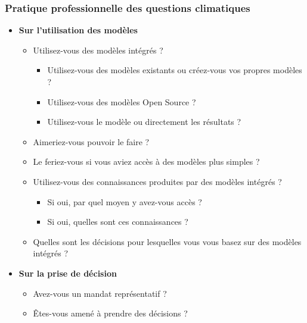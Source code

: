 \subsubsection*{Pratique professionnelle des questions climatiques}
\begin{itemize}
    \item \textbf{Sur l'utilisation des modèles}
    \begin{itemize}
        \item Utilisez-vous des modèles intégrés ? 
        \begin{itemize}
            \item Utilisez-vous des modèles existants ou créez-vous vos propres modèles ?
            \item Utilisez-vous des modèles Open Source ?
            \item Utilisez-vous le modèle ou directement les résultats ?
        \end{itemize}
        \item Aimeriez-vous pouvoir le faire ?
        \item Le feriez-vous si vous aviez accès à des modèles plus simples ?
        \item Utilisez-vous des connaissances produites par des modèles intégrés ?
        \begin{itemize}
            \item Si oui, par quel moyen y avez-vous accès ?
            \item Si oui, quelles sont ces connaissances ?
        \end{itemize}
        \item Quelles sont les décisions pour lesquelles vous vous basez sur des modèles intégrés ?
    \end{itemize}
    \item \textbf{Sur la prise de décision}
    \begin{itemize}
        \item Avez-vous un mandat représentatif ?
        \item Êtes-vous amené à prendre des décisions ?
    \end{itemize}
\end{itemize}

